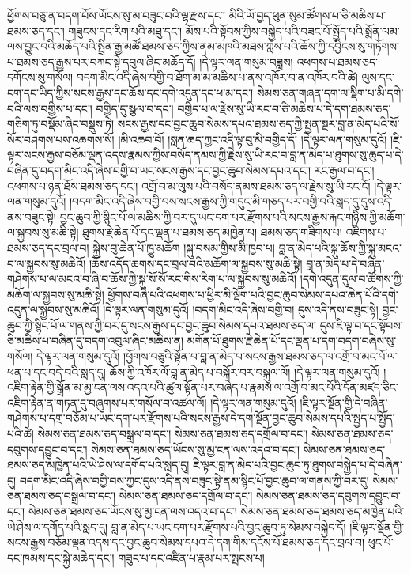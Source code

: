 ཕྱོགས་བཅུ་ན་བདག་པོས་ཡོངས་སུ་མ་བཟུང་བའི་ལྷ་རྫས་དང་། མིའི་ཡོ་བྱད་ཕུན་སུམ་ཚོགས་པ་ཅི་མཆིས་པ་ཐམས་ཅད་དང་། གཟུངས་དང་རིག་པའི་མཐུ་དང་། མོས་པའི་སྟོབས་ཀྱིས་བསྐྱེད་པའི་བཟང་པོ་སྤྱོད་པའི་སྨོན་ལམ་ལས་བྱུང་བའི་མཆོད་པའི་སྤྲིན་རྒྱ་མཚོ་ཐམས་ཅད་ཀྱིས་ནམ་མཁའི་མཐས་ཀླས་པའི་ཆོས་ཀྱི་དབྱིངས་སུ་གཏོགས་པ་ཐམས་ཅད་རྒྱས་པར་བཀང་སྟེ་དབུལ་ཞིང་མཆོད་དོ། །དེ་ལྟར་ལན་གསུམ་བཟླས། འཕགས་པ་ཐམས་ཅད་དགོངས་སུ་གསོལ། བདག་མིང་འདི་ཞེས་བགྱི་བ་ཐོག་མ་མ་མཆིས་པ་ནས་འཁོར་བ་ན་འཁོར་བའི་ཚེ། ལུས་དང་ངག་དང་ཡིད་ཀྱིས་སངས་རྒྱས་དང་ཆོས་དང་དགེ་འདུན་དང་ཕ་མ་དང་། སེམས་ཅན་གཞན་དག་ལ་སྡིག་པ་མི་དགེ་བའི་ལས་བགྱིས་པ་དང་། བགྱིད་དུ་སྩལ་བ་དང་། བགྱིད་པ་ལ་རྗེས་སུ་ཡི་རང་བ་ཅི་མཆིས་པ་དེ་དག་ཐམས་ཅད་གཅིག་ཏུ་བསྡོམ་ཞིང་བསྡུས་ཏེ། སངས་རྒྱས་དང་བྱང་ཆུབ་སེམས་དཔའ་ཐམས་ཅད་ཀྱི་སྤྱན་སྔར་བླ་ན་མེད་པའི་སོ་སོར་བཤགས་པས་འཆགས་སོ། །མི་འཆབ་བོ། །སླན་ཆད་ཀྱང་འདི་ལྟ་བུ་མི་བགྱིད་དོ། །དེ་ལྟར་ལན་གསུམ་དུའོ། །ཇི་ལྟར་སངས་རྒྱས་བཅོམ་ལྡན་འདས་རྣམས་ཀྱིས་བསོད་ནམས་ཀྱི་རྗེས་སུ་ཡི་རང་བ་བླ་ན་མེད་པ་ཐུགས་སུ་ཆུད་པ་དེ་བཞིན་དུ་བདག་མིང་འདི་ཞེས་བགྱི་བ་ཡང་སངས་རྒྱས་དང་བྱང་ཆུབ་སེམས་དཔའ་དང་། རང་རྒྱལ་བ་དང་། འཕགས་པ་ཉན་ཐོས་ཐམས་ཅད་དང་། འགྲོ་བ་མ་ལུས་པའི་བསོད་ནམས་ཐམས་ཅད་ལ་རྗེས་སུ་ཡི་རང་ངོ། །དེ་ལྟར་ལན་གསུམ་དུའོ། །བདག་མིང་འདི་ཞེས་བགྱི་བས་སངས་རྒྱས་ཀྱི་གདུང་མི་གཅད་པར་བགྱི་བའི་སླད་དུ་དུས་འདི་ནས་བཟུང་སྟེ། བྱང་ཆུབ་ཀྱི་སྙིང་པོ་ལ་མཆིས་ཀྱི་བར་དུ་ཡང་དག་པར་རྫོགས་པའི་སངས་རྒྱས་རྐང་གཉིས་ཀྱི་མཆོག་ལ་སྐྱབས་སུ་མཆི་སྟེ། ཐུགས་རྗེ་ཆེན་པོ་དང་ལྡན་པ་ཐམས་ཅད་མཁྱེན་པ། ཐམས་ཅད་གཟིགས་པ། འཇིགས་པ་ཐམས་ཅད་དང་བྲལ་བ། སྐྱེས་བུ་ཆེན་པོ་ཁྱུ་མཆོག །སྐུ་བསམ་གྱིས་མི་ཁྱབ་པ། བླ་ན་མེད་པའི་སྐུ་ཆོས་ཀྱི་སྐུ་མངའ་བ་ལ་སྐྱབས་སུ་མཆིའོ། །ཆོས་འདོད་ཆགས་དང་བྲལ་བའི་མཆོག་ལ་སྐྱབས་སུ་མཆི་སྟེ། བླ་ན་མེད་པ་དེ་བཞིན་གཤེགས་པ་ལ་མངའ་བ་ཞི་བ་ཆོས་ཀྱི་སྐུ་སོ་སོ་རང་གིས་རིག་པ་ལ་སྐྱབས་སུ་མཆིའོ། །དགེ་འདུན་དུལ་བ་ཚོགས་ཀྱི་མཆོག་ལ་སྐྱབས་སུ་མཆི་སྟེ། ཕྱོགས་བཞི་པའི་འཕགས་པ་ཕྱིར་མི་ལྡོག་པའི་བྱང་ཆུབ་སེམས་དཔའ་ཆེན་པོའི་དགེ་འདུན་ལ་སྐྱབས་སུ་མཆིའོ། །དེ་ལྟར་ལན་གསུམ་དུའོ། །བདག་མིང་འདི་ཞེས་བགྱི་བ། དུས་འདི་ནས་བཟུང་སྟེ། བྱང་ཆུབ་ཀྱི་སྙིང་པོ་ལ་གནས་ཀྱི་བར་དུ་སངས་རྒྱས་དང་བྱང་ཆུབ་སེམས་དཔའ་ཐམས་ཅད་ལ། དུས་ཇི་ལྟ་བ་དང་སྟོབས་ཅི་མཆིས་པ་བཞིན་དུ་བདག་འབུལ་ཞིང་མཆིས་ན། མགོན་པོ་ཐུགས་རྗེ་ཆེན་པོ་དང་ལྡན་པ་དག་བདག་བཞེས་སུ་གསོལ། དེ་ལྟར་ལན་གསུམ་དུའོ། །ཕྱོགས་བཅུའི་སྟོན་པ་བླ་ན་མེད་པ་སངས་རྒྱས་ཐམས་ཅད་ལ་འགྲོ་བ་མང་པོ་ལ་ཕན་པ་དང་བདེ་བའི་སླད་དུ། ཆོས་ཀྱི་འཁོར་ལོ་བླ་ན་མེད་པ་བསྐོར་བར་བསྐུལ་ལོ། །དེ་ལྟར་ལན་གསུམ་དུའོ། །འཇིག་རྟེན་གྱི་སྒྲོན་མ་མྱ་ངན་ལས་འདའ་པའི་ཚུལ་སྟོན་པར་བཞེད་པ་རྣམས་ལ་འགྲོ་བ་མང་པོའི་དོན་མཛད་ཅིང་འཇིག་རྟེན་ན་གཏན་དུ་བཞུགས་པར་གསོལ་བ་འཚལ་ལོ། །དེ་ལྟར་ལན་གསུམ་དུའོ། །ཇི་ལྟར་སྔོན་གྱི་དེ་བཞིན་གཤེགས་པ་དགྲ་བཅོམ་པ་ཡང་དག་པར་རྫོགས་པའི་སངས་རྒྱས་དེ་དག་སྔོན་བྱང་ཆུབ་སེམས་དཔའི་སྤྱད་པ་སྤྱོད་པའི་ཚེ། སེམས་ཅན་ཐམས་ཅད་བསྒྲལ་བ་དང་། སེམས་ཅན་ཐམས་ཅད་དགྲོལ་བ་དང་། སེམས་ཅན་ཐམས་ཅད་དབུགས་དབྱུང་བ་དང་། སེམས་ཅན་ཐམས་ཅད་ཡོངས་སུ་མྱ་ངན་ལས་འདའ་བ་དང་། སེམས་ཅན་ཐམས་ཅད་ཐམས་ཅད་མཁྱེན་པའི་ཡེ་ཤེས་ལ་དགོད་པའི་སླད་དུ། ཇི་ལྟར་བླ་ན་མེད་པའི་བྱང་ཆུབ་ཏུ་ཐུགས་བསྐྱེད་པ་དེ་བཞིན་དུ། བདག་མིང་འདི་ཞེས་བགྱི་བས་ཀྱང་དུས་འདི་ནས་བཟུང་སྟེ་ནམ་སྙིང་པོ་བྱང་ཆུབ་ལ་གནས་ཀྱི་བར་དུ། སེམས་ཅན་ཐམས་ཅད་བསྒྲལ་བ་དང་། སེམས་ཅན་ཐམས་ཅད་དགྲོལ་བ་དང་། སེམས་ཅན་ཐམས་ཅད་དབུགས་དབྱུང་བ་དང་། སེམས་ཅན་ཐམས་ཅད་ཡོངས་སུ་མྱ་ངན་ལས་འདའ་བ་དང་། སེམས་ཅན་ཐམས་ཅད་ཐམས་ཅད་མཁྱེན་པའི་ཡེ་ཤེས་ལ་དགོད་པའི་སླད་དུ། བླ་ན་མེད་པ་ཡང་དག་པར་རྫོགས་པའི་བྱང་ཆུབ་ཏུ་སེམས་བསྐྱེད་དོ། །ཇི་ལྟར་སྔོན་གྱི་སངས་རྒྱས་བཅོམ་ལྡན་འདས་དང་བྱང་ཆུབ་སེམས་དཔའ་དེ་དག་གིས་དངོས་པོ་ཐམས་ཅད་དང་བྲལ་བ། ཕུང་པོ་དང་ཁམས་དང་སྐྱེ་མཆེད་དང་། གཟུང་པ་དང་འཛིན་པ་རྣམ་པར་སྤངས་པ། 
